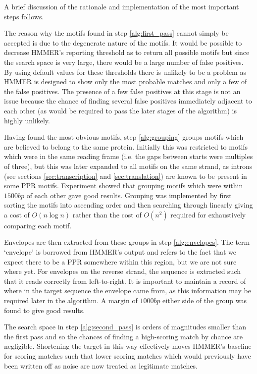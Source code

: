 A brief discussion of the rationale and implementation of the most important 
steps follows.

The reason why the motifs found in step \ref{alg:first_pass} cannot simply be
accepted is due to the degenerate nature of the motifs.
It would be possible to decrease HMMER's reporting threshold as to return all
possible motifs but since the search space is very large, there would be a
large number of false positives.
By using default values for these thresholds there is unlikely to be a problem 
as HMMER is designed to show only the most probable matches and only a few of
the false positives.
The presence of a few false positives at this stage is not an issue because the
chance of finding several false positives immediately adjacent to each other 
(as would be required to pass the later stages of the algorithm) is highly 
unlikely.

Having found the most obvious motifs, step \ref{alg:grouping} groups motifs
which are believed to belong to the same protein.
Initially this was restricted to motifs which were in the same reading frame
(i.e. the gaps between starts were multiples of three), but this was later
expanded to all motifs on the same strand, as introns (see sections
\ref{sec:transcription} and \ref{sec:translation}) are known to be
present in some PPR motifs.
Experiment showed that grouping motifs which were within $1500bp$ of each other
gave good results.
Grouping was implemented by first sorting the motifs into ascending order and 
then searching through linearly giving a cost of $O(n \log n)$ rather than the 
cost of $O(n^2)$ required for exhaustively comparing each motif.

Envelopes are then extracted from these groups in step \ref{alg:envelopes}.
The term `envelope' is borrowed from HMMER's output and refers to the fact that
we expect there to be a PPR somewhere within this region, but we are not sure
where yet.
For envelopes on the reverse strand, the sequence is extracted such that it
reads correctly from left-to-right.
It is important to maintain a record of where in the target sequence the
envelope came from, as this information may be required later in the algorithm.
A margin of $1000bp$ either side of the group was found to give good results.

The search space in step \ref{alg:second_pass} is orders of magnitudes smaller
than the first pass and so the chances of finding a high-scoring match by
chance are negligible.
Shortening the target in this way effectively moves HMMER's baseline for
scoring matches such that lower scoring matches which would previously have 
been written off as noise are now treated as legitimate matches.

